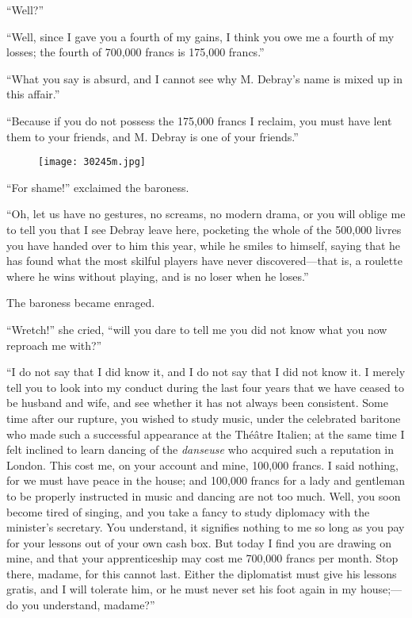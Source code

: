 “Well?”

“Well, since I gave you a fourth of my gains, I think you owe me a
fourth of my losses; the fourth of 700,000 francs is 175,000 francs.”

“What you say is absurd, and I cannot see why M. Debray’s name is mixed
up in this affair.”

“Because if you do not possess the 175,000 francs I reclaim, you must
have lent them to your friends, and M. Debray is one of your friends.”

\begin{figure}[ht]
\texttt{[image: 30245m.jpg]}
\end{figure}

“For shame!” exclaimed the baroness.

“Oh, let us have no gestures, no screams, no modern drama, or you will
oblige me to tell you that I see Debray leave here, pocketing the whole
of the 500,000 livres you have handed over to him this year, while he
smiles to himself, saying that he has found what the most skilful
players have never discovered—that is, a roulette where he wins without
playing, and is no loser when he loses.”

The baroness became enraged.

“Wretch!” she cried, “will you dare to tell me you did not know what
you now reproach me with?”

“I do not say that I did know it, and I do not say that I did not know
it. I merely tell you to look into my conduct during the last four
years that we have ceased to be husband and wife, and see whether it
has not always been consistent. Some time after our rupture, you wished
to study music, under the celebrated baritone who made such a
successful appearance at the Théâtre Italien; at the same time I felt
inclined to learn dancing of the \textit{danseuse} who acquired such a
reputation in London. This cost me, on your account and mine, 100,000
francs. I said nothing, for we must have peace in the house; and
100,000 francs for a lady and gentleman to be properly instructed in
music and dancing are not too much. Well, you soon become tired of
singing, and you take a fancy to study diplomacy with the minister’s
secretary. You understand, it signifies nothing to me so long as you
pay for your lessons out of your own cash box. But today I find you are
drawing on mine, and that your apprenticeship may cost me 700,000
francs per month. Stop there, madame, for this cannot last. Either the
diplomatist must give his lessons gratis, and I will tolerate him, or
he must never set his foot again in my house;—do you understand,
madame?”

